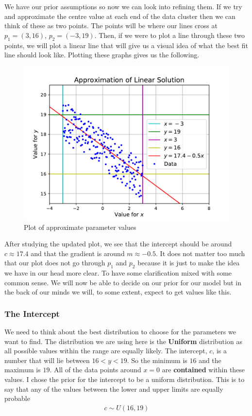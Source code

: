 \documentclass[12pt,twoside]{report}   %
\begin{document}
We have our prior assumptions so now we can look into refining them. If we try and approximate the centre value at each end of the data cluster then we can think of these as two points. The points will be where our lines cross at $p_1 = (3,16)$, $p_2 = (-3,19)$. Then, if we were to plot a line through these two points, we will plot a linear line that will give us a visual idea of what the best fit line should look like. Plotting these graphs gives us the following.
\begin{figure}[H]
\centering
\includegraphics[width = 5in]{Approx.pdf}
\caption{Plot of approximate parameter values}
\label{figLinearDataLines}
\end{figure}

After studying the updated plot, we see that the intercept should be around $c\approx 17.4$ and that the gradient is around $m\approx -0.5$. It does not matter too much that our plot does not go through $p_1$ and $p_2$ because it is just to make the idea we have in our head more clear. To have some clarification mixed with some common sense. We will now be able to decide on our prior for our model but in the back of our minds we will, to some extent, expect to get values like this.

\subsubsection{The Intercept}\label{The Intercept}

We need to think about the best distribution to choose for the parameters we want to find. The distribution we are using here is the \textbf{Uniform} distribution as all possible values within the range are equally likely. The intercept, $c$, is a number that will lie between $16<y<19$. So the minimum is $16$ and the maximum is $19$. All of the data points around $x=0$ are \textbf{contained} within these values. I chose the prior for the intercept to be a uniform distribution. This is to say that any of the values between the lower and upper limits are equally probable
\begin{align*}
c \sim U(16, 19)
\end{align*}
\end{document}
